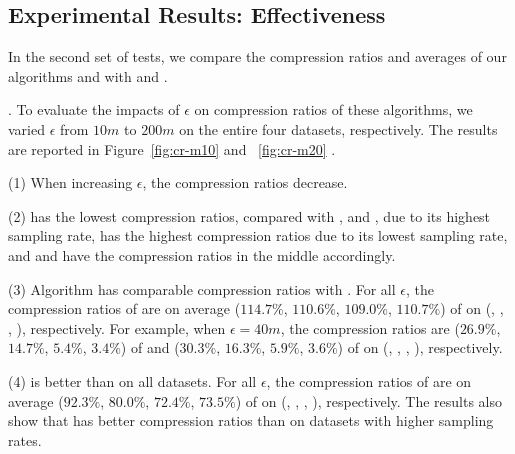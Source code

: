 \subsection{Experimental Results: Effectiveness}
In the second set of tests, we compare the compression ratios and averages of our algorithms \cist and \cista with \dpa and \squishe.



.
To evaluate the impacts of $\epsilon$ on compression ratios of these algorithms, we varied $\epsilon$ from $10m$ to $200m$ on
 the entire four datasets, respectively.
The results are reported in Figure~\ref{fig:cr-m10} and ~\ref{fig:cr-m20} .

\ni (1) When increasing $\epsilon$, the compression ratios decrease.


\ni (2) \pricar has the lowest compression ratios, compared with \truck, \sercar and \geolife, due to its highest sampling rate,
\truck has the highest compression ratios due to its lowest sampling rate, and \sercar and \geolife have the compression ratios in the middle accordingly.

\ni (3) Algorithm \cist has \textcolor[rgb]{1.00,0.00,0.00}{comparable} compression ratios with \dpa.
For all $\epsilon$, the compression ratios of \cist are on average ($114.7\%$, $110.6\%$, $109.0\%$, $110.7\%$) of \dpa on (\truck, \sercar, \geolife, \pricar), respectively.
For example, when $\epsilon = 40m$, the compression ratios are ($26.9\%$, $14.7\%$, $5.4\%$, $3.4\%$) of \dpa and ($30.3\%$, $16.3\%$, $5.9\%$, $3.6\%$) of \cist on (\truck, \sercar, \geolife, \pricar), respectively.

\ni (4) \cist is better than  \squishe on all datasets.
For all $\epsilon$, the compression ratios of \cist are on average ($92.3\%$, $80.0\%$, $72.4\%$, {$73.5\%$}) of \squishe on (\truck, \sercar, \geolife, \pricar), respectively.
The results also show that \cist has better compression ratios than \squishe on datasets with higher sampling rates.




